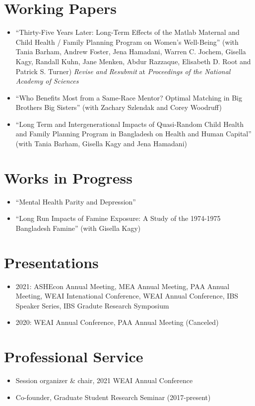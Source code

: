 \documentclass[letterpaper]{article}
\begin{document}
\section*{Working Papers}
\begin{itemize}
	\item ``Thirty-Five Years Later: Long-Term Effects of the Matlab Maternal and Child Health / Family Planning Program on Women's Well-Being'' (with Tania Barham, Andrew Foster, Jena Hamadani, Warren C. Jochem, Gisella Kagy, Randall Kuhn, Jane Menken, Abdur Razzaque, Elisabeth D. Root and Patrick S. Turner) \textit{Revise and Resubmit} at \textit{Proceedings of the National Academy of Sciences}
	\item ``Who Benefits Most from a Same-Race Mentor? Optimal Matching in Big Brothers Big Sisters'' (with Zachary Szlendak and Corey Woodruff)
	\item ``Long Term and Intergenerational Impacts of Quasi-Random Child Health and Family Planning Program in Bangladesh on Health and Human Capital'' (with Tania Barham, Gisella Kagy and Jena Hamadani)
	
\end{itemize}

\section*{Works in Progress}
\begin{itemize}
	\item ``Mental Health Parity and Depression''
	\item ``Long Run Impacts of Famine Exposure: A Study of the 1974-1975 Bangladesh Famine'' (with Gisella Kagy)
\end{itemize}

\section*{Presentations}
\begin{itemize}
	\item[] 2021: ASHEcon Annual Meeting, MEA Annual Meeting, PAA Annual Meeting, WEAI Intenational Conference, WEAI Annual Conference, IBS Speaker Series, IBS Gradute Research Symposium
	\item[] 2020: WEAI Annual Conference, PAA Annual Meeting (Canceled)
\end{itemize}

\section*{Professional Service}
\begin{itemize}
	\item[] Session organizer \& chair, 2021 WEAI Annual Conference 
	\item[] Co-founder, Graduate Student Research Seminar (2017-present)
\end{itemize}
\end{document}
